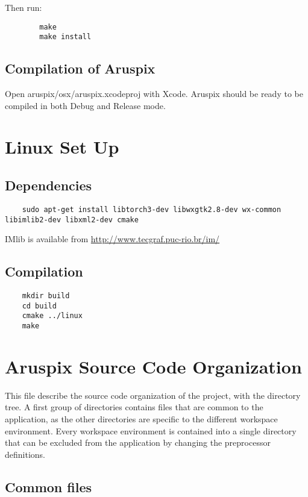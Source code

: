 \documentclass[]{article}
\begin{document}
	Then run:
	\begin{verbatim} 
		make
		make install
	\end{verbatim}

\subsection{Compilation of Aruspix}
Open aruspix/osx/aruspix.xcodeproj with Xcode.
Aruspix should be ready to be compiled in both Debug and Release mode. 

\section{Linux Set Up}

\subsection{Dependencies}
 \begin{verbatim}
	sudo apt-get install libtorch3-dev libwxgtk2.8-dev wx-common libimlib2-dev libxml2-dev cmake
 \end{verbatim}

 IMlib is available from \url{http://www.tecgraf.puc-rio.br/im/}
\subsection{Compilation}

 \begin{verbatim}
	mkdir build
	cd build
	cmake ../linux
	make
 \end{verbatim}

\section{Aruspix Source Code Organization}

This file describe the source code organization of the project, with the directory tree.
A first group of directories contains files that are common to the application, as the
other directories are specific to the different workspace environment. Every workspace
environment is contained into a single directory that can be excluded from the application
by changing the preprocessor definitions.\\

\subsection{Common files}
\end{document}
